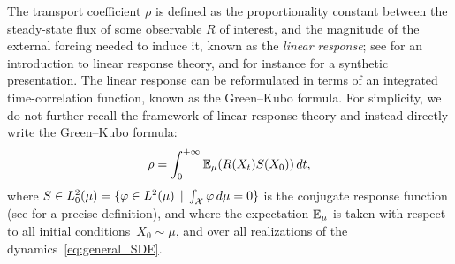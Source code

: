  The transport coefficient $\rho$ is defined as the proportionality constant between the steady-state flux of some observable $R$ of interest, and the magnitude of the external forcing needed to induce it, known as the \emph{linear response}; see \cite[Chapter 8]{chandler1987} for an introduction to linear response theory, and for instance \cite[Section 2]{synthetic2023} for a synthetic presentation. The linear response can be reformulated in terms of an integrated time-correlation function, known as the Green--Kubo formula. For simplicity, we do not further recall the framework of linear response theory and instead directly write the Green--Kubo formula:
%
\begin{align}
	\rho = \int_0^{+\infty} \E_\mu(R(X_t) S(X_0)) \, dt,%
	\label{eq:gk}
\end{align}
%
where $S \in L^2_0(\mu) = \{\varphi \in L^2(\mu) \, \mid \, \int_{\mathcal{X}} \varphi \, d\mu = 0\}$ is the conjugate response function (see \cite[Section 5.2.3]{acta_numerica2016} for a precise definition), and where the expectation $\mathbb{E}_\mu$ is taken with respect to all initial conditions~$X_0\sim \mu$, and over all realizations of the dynamics~\eqref{eq:general_SDE}. 

